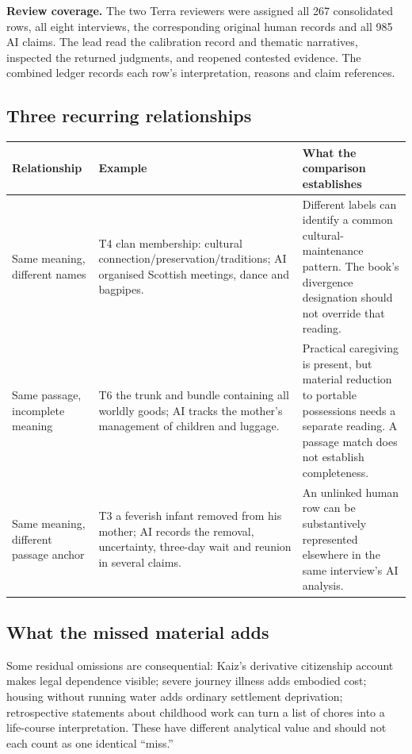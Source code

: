 \begin{takeaway}
\textbf{Review coverage.} The two Terra reviewers were assigned all 267 consolidated rows, all eight interviews, the corresponding original human records and all 985 AI claims. The lead read the calibration record and thematic narratives, inspected the returned judgments, and reopened contested evidence. The combined ledger records each row's interpretation, reasons and claim references.
\end{takeaway}

\subsection*{Three recurring relationships}
\begin{tabularx}{\linewidth}{@{}p{3.2cm}YY@{}}
\toprule
\textbf{Relationship} & \textbf{Example} & \textbf{What the comparison establishes}\tabularnewline\midrule
Same meaning, different names & T4 clan membership: cultural connection/preservation/traditions; AI organised Scottish meetings, dance and bagpipes. & Different labels can identify a common cultural-maintenance pattern. The book's divergence designation should not override that reading.\tabularnewline\addlinespace
Same passage, incomplete meaning & T6 the trunk and bundle containing all worldly goods; AI tracks the mother's management of children and luggage. & Practical caregiving is present, but material reduction to portable possessions needs a separate reading. A passage match does not establish completeness.\tabularnewline\addlinespace
Same meaning, different passage anchor & T3 a feverish infant removed from his mother; AI records the removal, uncertainty, three-day wait and reunion in several claims. & An unlinked human row can be substantively represented elsewhere in the same interview's AI analysis.\tabularnewline\bottomrule
\end{tabularx}

\subsection*{What the missed material adds}
Some residual omissions are consequential: Kaiz's derivative citizenship account makes legal dependence visible; severe journey illness adds embodied cost; housing without running water adds ordinary settlement deprivation; retrospective statements about childhood work can turn a list of chores into a life-course interpretation. These have different analytical value and should not each count as one identical ``miss.''

